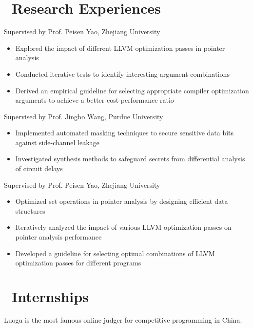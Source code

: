 \documentclass{resume}
\begin{document}
\section{\faSearch\ Research Experiences}
Supervised by Prof. Peisen Yao, Zhejiang University  
\begin{itemize}[itemsep=0.5ex]  
  \item Explored the impact of different LLVM optimization passes in pointer analysis  
  \item Conducted iterative tests to identify interesting argument combinations  
  \item Derived an empirical guideline for selecting appropriate compiler optimization arguments to achieve a better cost-performance ratio  
\end{itemize}

Supervised by Prof. Jingbo Wang, Purdue University
\begin{itemize}[itemsep=0.5ex]  
  \item Implemented automated masking techniques to secure sensitive data bits against side-channel leakage  
  \item Investigated synthesis methods to safeguard secrets from differential analysis of circuit delays  
\end{itemize}

Supervised by Prof. Peisen Yao, Zhejiang University
\begin{itemize}[itemsep=0.5ex]
  \item Optimized set operations in pointer analysis by designing efficient data structures
  \item Iteratively analyzed the impact of various LLVM optimization passes on pointer analysis performance
  \item Developed a guideline for selecting optimal combinations of LLVM optimization passes for different programs
\end{itemize}

\section{\faUsers\ Internships}
Luogu is the most famous online judger for competitive programming in China.
\end{document}

